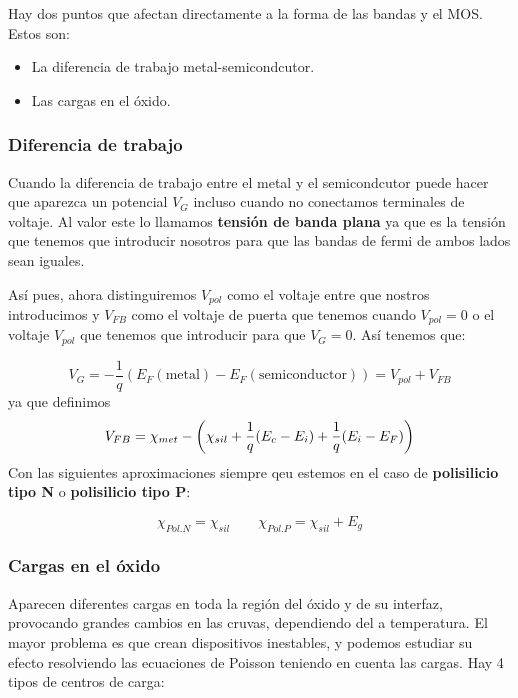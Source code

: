 Hay dos puntos que afectan directamente a la forma de las bandas y el MOS. Estos son: 

\begin{itemize}
	\item La diferencia de trabajo metal-semicondcutor.
	\item Las cargas en el óxido.
\end{itemize}

\subsubsection{Diferencia de trabajo}

Cuando la diferencia de trabajo entre el metal y el semicondcutor puede hacer que aparezca un potencial $V_G$ incluso cuando no conectamos terminales de voltaje. Al valor este lo llamamos \textbf{tensión de banda plana} ya que es la tensión que tenemos que introducir nosotros para que las bandas de fermi de ambos lados sean iguales. 

Así pues, ahora distinguiremos $V_{pol}$ como el voltaje entre que nostros introducimos y $V_{FB}$ como el voltaje de puerta que tenemos cuando $V_{pol}=0$ o el voltaje $V_{pol}$ que tenemos que introducir para que $V_{G}=0$. Así tenemos que:

\begin{equation}
	V_G = - \frac{1}{q} (E_F (\text{metal}) - E_F (\text{semiconductor}) ) = V_{pol} + V_{FB}
\end{equation}
ya que definimos 
\begin{equation}
	V_{FB} = \chi_{met} - \left( \chi_{sil} + \frac{1}{q} (E_c-E_i) + \frac{1}{q} (E_i-E_F) \right)
\end{equation}
Con las siguientes aproximaciones siempre qeu estemos en el caso de \textbf{polisilicio tipo N} o \textbf{polisilicio tipo P}: 

\begin{equation}
	\chi_{Pol. N} = \chi_{sil} \qquad  \chi_{Pol. P} = \chi_{sil} + E_g
\end{equation}

\subsubsection{Cargas en el óxido}

Aparecen diferentes cargas en toda la región del óxido y de su interfaz, provocando grandes cambios en las cruvas, dependiendo del a temperatura. El mayor problema es que crean dispositivos inestables, y podemos estudiar su efecto resolviendo las ecuaciones de Poisson teniendo en cuenta las cargas. Hay 4 tipos de centros de carga: 

